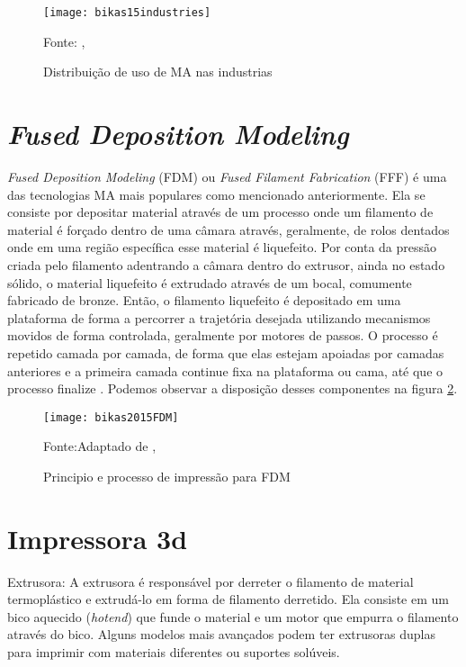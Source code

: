 \begin{figure}[H]
    \begin{center}
    \caption{Distribuição de uso de MA nas industrias}
    \texttt{[image: bikas15industries]}

    {\footnotesize Fonte: \citeauthor{bikas16}, \citeyear{bikas16}}
    \label{fig:MA_industrias}
    \end{center}
\end{figure}

\section{\textit{Fused Deposition Modeling}}
\textit{Fused Deposition Modeling} (FDM) ou \textit{Fused Filament Fabrication} 
(FFF) é uma das tecnologias MA mais populares como mencionado anteriormente.
Ela se consiste por depositar material através de um processo 
onde um filamento de material é forçado dentro de uma câmara através,
geralmente, de rolos dentados onde em uma região específica esse 
material é liquefeito. Por conta da pressão criada pelo filamento 
adentrando a câmara dentro do extrusor, ainda no estado sólido, 
o material liquefeito é extrudado através de um bocal, 
comumente fabricado de bronze. Então, o filamento liquefeito é 
depositado em uma plataforma de forma a percorrer a trajetória 
desejada utilizando mecanismos movidos de forma controlada, 
geralmente por motores de passos. O processo é repetido camada 
por camada, de forma que elas estejam apoiadas por camadas 
anteriores e a primeira camada continue fixa na plataforma ou 
cama, até que o processo finalize \cite{turner14}.
Podemos observar a disposição desses componentes na figura \ref{fig:fdm_ex}.

\begin{figure}[H]
    \begin{center}
    \caption{Principio e processo de impressão para FDM}
    \texttt{[image: bikas2015FDM]}

    {\footnotesize Fonte:Adaptado de \citeauthor{bikas16}, \citeyear{bikas16}}
    \label{fig:fdm_ex}
    \end{center}
\end{figure}

\section{Impressora 3d}

Extrusora: A extrusora é responsável por derreter o filamento de material termoplástico e extrudá-lo 
em forma de filamento derretido. 
Ela consiste em um bico aquecido (\textit{hotend}) que funde o material e um motor que empurra o 
filamento através do bico. Alguns modelos mais avançados podem ter extrusoras duplas para 
imprimir com materiais diferentes ou suportes solúveis.

